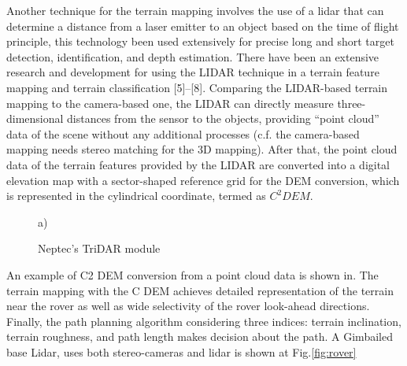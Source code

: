 Another technique for the terrain mapping involves the use of a lidar that can determine a distance from a laser emitter to an object based on the time of flight principle, this technology been used extensively for precise long and short target detection, identification, and depth estimation. There have been an extensive research and development for using the LIDAR technique in a terrain feature mapping and terrain classification [5]–[8]. Comparing the LIDAR-based terrain mapping to the camera-based one, the LIDAR can directly measure three-dimensional distances from the sensor to the objects, providing “point cloud” data of the scene without any additional processes (c.f. the camera-based mapping needs stereo matching for the 3D mapping). 
After that, the point cloud data of the terrain features provided by the LIDAR are converted into a digital elevation map with a sector-shaped reference grid  for the DEM conversion, which is represented in the cylindrical coordinate, termed as $C^2DEM$.





\begin{minipage}[h]{0.40\linewidth}
\begin{figure}[H]
 a) \\
\caption{Neptec's TriDAR module}
\label{fig:cubesat}
\end{figure}
\end{minipage}
\hfill
\begin{minipage}[h]{0.48\linewidth}

An example of C2 DEM conversion from a point cloud data is shown in.
The terrain mapping with the C DEM achieves detailed representation of the terrain near the rover as well as wide selectivity of the rover look-ahead directions.
Finally, the path planning algorithm considering three indices: terrain inclination, terrain roughness, and path length makes decision about  the path.
A Gimbailed base Lidar, uses both stereo-cameras and lidar is shown at Fig.\ref{fig:rover}
\end{minipage}
\vspace{1cm}







